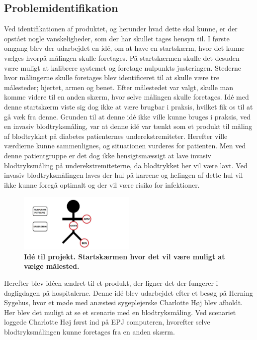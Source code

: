\subsection{Problemidentifikation}
Ved identifikationen af produktet, og herunder hvad dette skal kunne, er der opstået nogle vanskeligheder, som der har skullet tages hensyn til. I første omgang blev der udarbejdet en idé, om at have en startskærm, hvor det kunne vælges hvorpå målingen skulle foretages. På startskærmen skulle det desuden være muligt at kalibrere systemet og foretage nulpunkts justeringen. Stederne hvor målingerne skulle foretages blev identificeret til at skulle være tre målesteder; hjertet, armen og benet. Efter målestedet var valgt, skulle man komme videre til en anden skærm, hvor selve målingen skulle foretages. Idé med denne startskærm viste sig dog ikke at være brugbar i praksis, hvilket fik os til at gå væk fra denne. Grunden til at denne idé ikke ville kunne bruges i praksis, ved en invasiv blodtryksmåling, var at denne idé var tænkt som et produkt til måling af blodtrykket på diabetes patienternes underekstremiteter. Herefter ville værdierne kunne sammenlignes, og situationen vurderes for patienten. Men ved denne patientgruppe er det dog ikke hensigtsmæssigt at lave invasiv blodtryksmåling på underekstremiteterne, da blodtrykket her vil være lavt. Ved invasiv blodtryksmålingen laves der hul på karrene og helingen af dette hul vil ikke kunne foregå optimalt og der vil være risiko for infektioner. \\
\begin{figure}[H]
\includegraphics[width =0.5\textwidth , center]{billeder/SkitseStartGammel}
\caption{\textbf{Idé til projekt. Startskærmen hvor det vil være muligt at vælge målested.}}
\end{figure}
Herefter blev idéen ændret til et produkt, der ligner det der fungerer i dagligdagen på hospitalerne. Denne idé blev udarbejdet efter et besøg på Herning Sygehus, hvor et møde med anæstesi sygeplejerske Charlotte Høj blev afholdt. Her blev det muligt at se et scenarie med en blodtryksmåling. Ved scenariet loggede Charlotte Høj først ind på EPJ computeren, hvorefter selve blodtryksmålingen kunne foretages fra en anden skærm.\\
